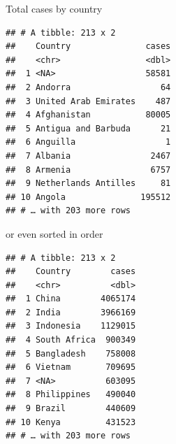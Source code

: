 \documentclass[ignorenonframetext,]{beamer}
\newenvironment{Shaded}{\begin{snugshade}}{\end{snugshade}}
\newcommand{\DataTypeTok}[1]{\textcolor[rgb]{0.13,0.29,0.53}{#1}}
\newcommand{\KeywordTok}[1]{\textcolor[rgb]{0.13,0.29,0.53}{\textbf{#1}}}
\newcommand{\NormalTok}[1]{#1}
\newcommand{\OperatorTok}[1]{\textcolor[rgb]{0.81,0.36,0.00}{\textbf{#1}}}
\newcommand{\StringTok}[1]{\textcolor[rgb]{0.31,0.60,0.02}{#1}}
\begin{document}
\begin{frame}[fragile]{Total cases by country}
\protect\hypertarget{total-cases-by-country}{}

\begin{Shaded}
\end{Shaded}

\begin{verbatim}
## # A tibble: 213 x 2
##    Country               cases
##    <chr>                 <dbl>
##  1 <NA>                  58581
##  2 Andorra                  64
##  3 United Arab Emirates    487
##  4 Afghanistan           80005
##  5 Antigua and Barbuda      21
##  6 Anguilla                  1
##  7 Albania                2467
##  8 Armenia                6757
##  9 Netherlands Antilles     81
## 10 Angola               195512
## # … with 203 more rows
\end{verbatim}

\end{frame}

\begin{frame}[fragile]{or even sorted in order}
\protect\hypertarget{or-even-sorted-in-order}{}

\begin{Shaded}
\end{Shaded}

\begin{verbatim}
## # A tibble: 213 x 2
##    Country        cases
##    <chr>          <dbl>
##  1 China        4065174
##  2 India        3966169
##  3 Indonesia    1129015
##  4 South Africa  900349
##  5 Bangladesh    758008
##  6 Vietnam       709695
##  7 <NA>          603095
##  8 Philippines   490040
##  9 Brazil        440609
## 10 Kenya         431523
## # … with 203 more rows
\end{verbatim}

\end{frame}
\end{document}
